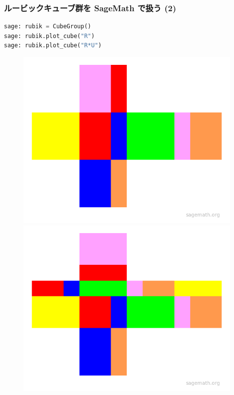 \documentclass{beamer}
\begin{document}
\begin{frame}[fragile]
    \frametitle{ルービックキューブ群を SageMath で扱う (2)}

    \begin{lstlisting}[language=Python]
sage: rubik = CubeGroup()
sage: rubik.plot_cube("R")
sage: rubik.plot_cube("R*U")
    \end{lstlisting}

    \begin{figure}
        \includegraphics[scale=0.35]{images/plot_cube_R.png}
        \includegraphics[scale=0.35]{images/plot_cube_RU.png}
    \end{figure}
\end{frame}
\end{document}
